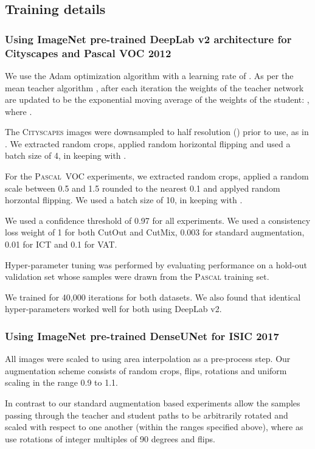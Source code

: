 \documentclass{bmvc2k}
\newcommand{\Cityscapes}{\textsc{Cityscapes}}
\newcommand{\Pascal}{\textsc{Pascal}}
\begin{document}
\subsection{Training details}
\label{app:seg:training}

\subsubsection{Using ImageNet pre-trained DeepLab v2 architecture for Cityscapes and Pascal VOC 2012}

We use the Adam \cite{Kingma:Adam} optimization algorithm with a learning rate of . As per the mean teacher algorithm \cite{Tarvainen:MeanTeachers}, after each iteration the weights  of the teacher network are updated to be the exponential moving average of the weights  of the student: , where .

The \Cityscapes{} images were downsampled to half resolution () prior to use, as in \cite{Hung:AdvSemiSupSeg}. We extracted  random crops, applied random horizontal flipping and used a batch size of 4,
in keeping with \cite{Mittal:SSSHiLow}.

For the \Pascal{}~VOC experiments, we extracted  random crops, applied a random scale between 0.5 and 1.5 rounded to the nearest 0.1 and applyed random horzontal flipping. We used a batch size of 10, in keeping with \cite{Hung:AdvSemiSupSeg}.

We used a confidence threshold of 0.97 for all experiments. We used a consistency loss weight of 1 for both CutOut and CutMix, 0.003 for standard augmentation, 0.01 for ICT and 0.1 for VAT.

Hyper-parameter tuning was performed by evaluating performance on a hold-out validation set whose samples were drawn from the \Pascal{} training set.

We trained for 40,000 iterations for both datasets. We also found that identical hyper-parameters worked well for both using DeepLab v2.


\subsubsection{Using ImageNet pre-trained DenseUNet for ISIC 2017}

All images were scaled to  using area interpolation as a pre-process step. Our augmentation scheme consists of random  crops, flips, rotations and uniform scaling in the range 0.9 to 1.1.

In contrast to \cite{Li:SemiSupSkin} our standard augmentation based experiments allow the samples passing through the teacher and student paths to be arbitrarily rotated and scaled with respect to one another (within
the ranges specified above), where as \cite{Li:SemiSupSkin} use rotations of integer multiples of 90 degrees and flips.
\end{document}
